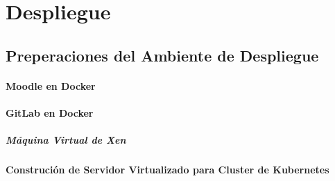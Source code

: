 
\chapter{Despliegue}
\label{capitulo6}

\section{Preperaciones del Ambiente de Despliegue}

\subsubsection{Moodle en Docker}

\subsubsection{GitLab en Docker}

\paragraph{Máquina Virtual de Xen}
\subsubsection{Construción de Servidor Virtualizado para Cluster de Kubernetes}
